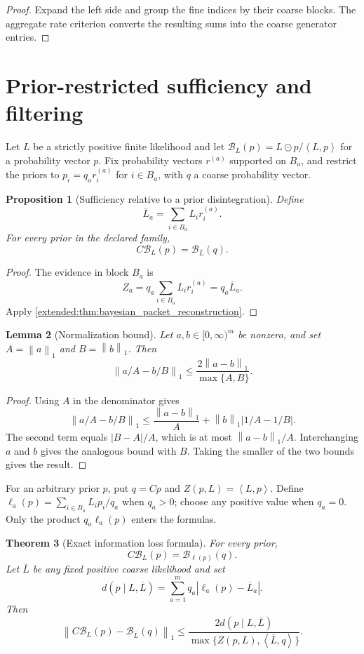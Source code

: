 \documentclass[11pt,a4paper]{article}
\newtheorem{theorem}{Theorem}[section]
\newtheorem{proposition}[theorem]{Proposition}
\newtheorem{lemma}[theorem]{Lemma}
\theoremstyle{definition}
\theoremstyle{remark}
\newcommand{\norm}[1]{\left\lVert#1\right\rVert}
\newcommand{\Bcal}{\mathcal B}
\newcommand{\abs}[1]{\left\lvert#1\right\rvert}
\newcommand{\ip}[2]{\left\langle#1,#2\right\rangle}
\begin{document}
\begin{proof}
Expand the left side and group the fine indices by their coarse blocks. The aggregate rate criterion converts the resulting sums into the coarse generator entries.
\end{proof}


\section{Prior-restricted sufficiency and filtering}\label{earlier:section:03}
Let $L$ be a strictly positive finite likelihood and let $\Bcal_L(p)=L\odot p/\ip{L}{p}$ for a probability vector $p$. Fix probability vectors $r^{(a)}$ supported on $B_a$, and restrict the priors to $p_i=q_a r_i^{(a)}$ for $i\in B_a$, with $q$ a coarse probability vector.
\begin{proposition}[Sufficiency relative to a prior disintegration]\label{earlier:record:011}\label{earlier:prop:relative_sufficiency}
Define
\[
\overline L_a
=
\sum_{i\in B_a}L_ir_i^{(a)}.
\]
For every prior in the declared family,
\[
C\Bcal_L(p)
=
\Bcal_{\overline L}(q).
\]
\end{proposition}

\begin{proof}
The evidence in block \(B_a\) is
\[
Z_a
=q_a\sum_{i\in B_a}L_ir_i^{(a)}
=q_a\overline L_a.
\]
Apply \cref{extended:thm:bayesian_packet_reconstruction}.
\end{proof}

\begin{lemma}[Normalization bound]\label{earlier:record:012}\label{earlier:lem:normalization_bound}
Let \(a,b\in[0,\infty)^m\) be nonzero, and set \(A=\norm a_1\) and \(B=\norm b_1\). Then
\[
\boxed{
\norm{a/A-b/B}_1
\leq
\frac{2\norm{a-b}_1}{\max\{A,B\}}.
}
\]
\end{lemma}

\begin{proof}
Using \(A\) in the denominator gives
\[
\norm{a/A-b/B}_1
\leq
\frac{\norm{a-b}_1}{A}
+
\norm b_1\abs{1/A-1/B}.
\]
The second term equals \(\abs{B-A}/A\), which is at most \(\norm{a-b}_1/A\). Interchanging \(a\) and \(b\) gives the analogous bound with \(B\). Taking the smaller of the two bounds gives the result.
\end{proof}


For an arbitrary prior $p$, put $q=Cp$ and $Z(p,L)=\ip{L}{p}$. Define $\ell_a(p)=\sum_{i\in B_a}L_ip_i/q_a$ when $q_a>0$; choose any positive value when $q_a=0$. Only the product $q_a\ell_a(p)$ enters the formulas.
\begin{theorem}[Exact information loss formula]\label{earlier:record:013}\label{earlier:thm:information_loss}
For every prior,
\[
\boxed{
C\Bcal_L(p)
=
\Bcal_{\ell(p)}(q).
}
\]
Let \(\overline L\) be any fixed positive coarse likelihood and set
\[
d(p\mid L,\overline L)
=
\sum_{a=1}^mq_a\abs{\ell_a(p)-\overline L_a}.
\]
Then
\[
\norm{
C\Bcal_L(p)-\Bcal_{\overline L}(q)
}_1
\leq
\frac{2d(p\mid L,\overline L)}
{\max\{Z(p,L),\ip{\overline L}{q}\}}.
\]
\end{theorem}
\end{document}

